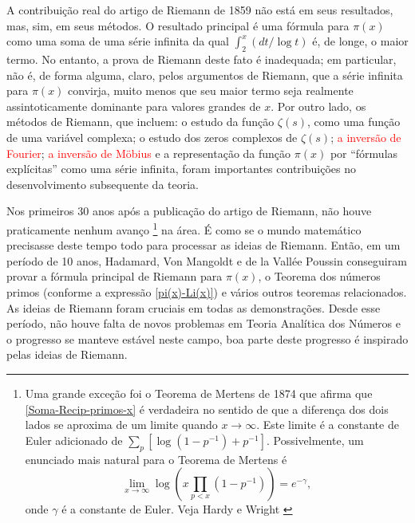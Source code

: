     A contribuição real do artigo de Riemann de 1859 não está em 
    seus resultados, mas, sim, em seus métodos. 
    O resultado principal é uma fórmula para $\pi(x)$ como uma soma de 
    uma série infinita da qual $\int_{2}^{x}(dt/\log t)$ é, de longe, o maior termo. 
    No entanto, a prova de Riemann deste fato é inadequada; 
    em particular, não é, de forma alguma, claro, pelos argumentos de Riemann, 
    que a série infinita para $\pi(x)$ convirja, muito menos que seu maior 
    termo seja realmente assintoticamente dominante para valores grandes de $x$. Por outro lado, os métodos de Riemann, 
    que incluem: o estudo da função $\zeta(s)$, como uma função de uma variável complexa; 
    o estudo dos zeros complexos de $\zeta(s)$;  \textcolor{red}{a inversão de Fourier}; 
    \textcolor{red}{a inversão de Möbius} e a representação da função $\pi(x)$ por ``fórmulas explícitas'' como uma série 
    infinita, foram importantes contribuições no desenvolvimento subsequente da teoria.
    
    Nos primeiros 30 anos após a publicação do artigo de Riemann, não houve praticamente nenhum avanço
    \footnote{ Uma grande exceção foi o Teorema de Mertens 
    \cite{MR1579612} de 1874 que afirma que \eqref{Soma-Recip-primos-x} 
    é verdadeira no sentido de que a diferença dos dois lados se 
    aproxima de um limite quando $x \to \infty$. Este limite é a 
    constante de Euler adicionado de $\sum_{p}[\log(1-p^{-1}) + p^{-1}]$. 
    Possivelmente, um enunciado mais natural para o Teorema de Mertens é 
    $$
    \lim_{x \to \infty} 
    \log \left( x \prod_{p<x}(1-p^{-1}) \right) 
    = 
    e^{-\gamma},
    $$
    onde $\gamma$ é a constante de Euler. 
    Veja Hardy e Wright \cite{MR0067125}}
    na área. É como se o mundo matemático precisasse deste tempo 
    todo para processar as ideias de Riemann. Então, em um período de 10 anos, 
    Hadamard, Von Mangoldt e de la Vallée Poussin conseguiram provar a 
    fórmula principal de Riemann para $\pi(x)$, 
    o Teorema dos números primos (conforme a expressão \eqref{pi(x)-Li(x)}) e vários outros 
    teoremas relacionados. As ideias de Riemann foram cruciais em 
    todas as demonstrações. Desde esse período, não houve falta de 
    novos problemas em Teoria Analítica dos Números e o progresso 
    se manteve estável neste campo, boa parte deste progresso é 
    inspirado pelas ideias de Riemann. 
    
